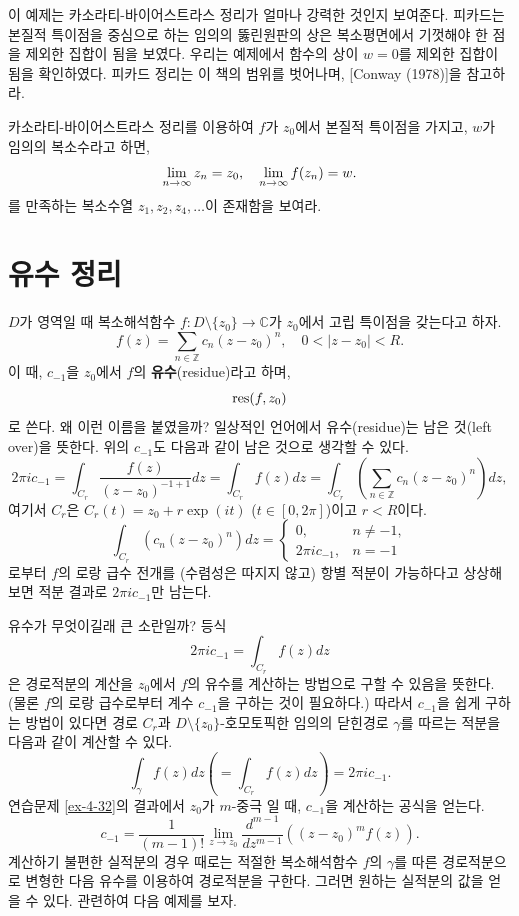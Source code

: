 이 예제는 카소라티-바이어스트라스 정리가 얼마나 강력한 것인지 보여준다.
피카드는 본질적 특이점을 중심으로 하는 임의의 뚫린원판의 상은
복소평면에서 기껏해야 한 점을 제외한 집합이 됨을 보였다.
우리는 예제에서 함수의 상이 $w=0$를 제외한 집합이 됨을 확인하였다.
피카드 정리는 이 책의 범위를 벗어나며, [Conway (1978)]을 참고하라.

\begin{salt_exercise}\label{ex-4-39}
카소라티-바이어스트라스 정리를 이용하여
$f$가 $z_0$에서 본질적 특이점을 가지고,
$w$가 임의의 복소수라고 하면,
\[
\lim\limits_{n\to \infty} z_n = z_0,
\quad
\lim\limits_{n\to\infty} f(z_n) = w.
\]
를 만족하는 복소수열 $z_1, z_2, z_4, \ldots$이 존재함을 보여라.
\end{salt_exercise}

\section{유수 정리}

$D$가 영역일 때
복소해석함수 $f:D\setminus \{z_0\}\to \mathbb C$가
$z_0$에서 고립 특이점을 갖는다고 하자.
\[
f(z) = \sum_{n\in\mathbb Z} c_n (z-z_0)^n,\quad
0<|z-z_0|<R.
\]
이 때, $c_{-1}$을 $z_0$에서 $f$의 {\bf 유수}(residue)라고 하며,
\[
\mathop{\mathrm{res}}(f,z_0)
\]
로 쓴다.
왜 이런 이름을 붙였을까?
일상적인 언어에서 유수(residue)는 남은 것(left over)을 뜻한다.
위의 $c_{-1}$도 다음과 같이 남은 것으로 생각할 수 있다.
\[
2\pi i c_{-1} = \int_{C_r} \dfrac{f(z)}{(z-z_0)^{-1+1}}dz
= \int_{C_r} f(z)dz 
= \int_{C_r} \left( \sum_{n\in\mathbb Z}c_n(z-z_0)^n\right) dz,
\]
여기서 $C_r$은 $C_r(t) = z_0 + r\exp(it)$ ($t\in[0,2\pi]$)이고
$r<R$이다.
\[
\int_{C_r} \left( c_n(z-z_0)^n \right) dz = 
\begin{cases}
0, & n\ne -1, \\
2\pi i c_{-1}, & n= -1
\end{cases}
\]
로부터 $f$의 로랑 급수 전개를 (수렴성은 따지지 않고) 항별 적분이 가능하다고 
상상해보면 적분 결과로 $2\pi i c_{-1}$만 남는다.

유수가 무엇이길래 큰 소란일까? 등식
\[
2\pi i c_{-1}= \int_{C_r} f(z)dz 
\]
은 경로적분의 계산을 $z_0$에서 $f$의 유수를 계산하는 방법으로 구할 수 있음을 뜻한다.
(물론 $f$의 로랑 급수로부터 계수 $c_{-1}$을 구하는 것이 필요하다.)
따라서 $c_{-1}$을 쉽게 구하는 방법이 있다면
경로 $C_r$과 $D\setminus\{z_0\}$-호모토픽한 임의의 닫힌경로 $\gamma$를 따르는 적분을
다음과 같이 계산할 수 있다.
\begin{equation} \label{eq-4-7}
\int_\gamma f(z)dz \left( = \int_{C_r} f(z)dz \right) = 2\pi i c_{-1}.
\end{equation}
연습문제 \ref{ex-4-32}의 결과에서 
$z_0$가 $m$-중극 일 때,
$c_{-1}$을 계산하는 공식을 얻는다.
\[
c_{-1} = \dfrac1{(m-1)!}\lim_{z\to z_0} \dfrac{d^{m-1}}{dz^{m-1}}
\left( (z-z_0)^m f(z) \right).
\]
계산하기 불편한 실적분의 경우 때로는
적절한 복소해석함수 $f$의 $\gamma$를 따른 경로적분으로 변형한 다음
유수를 이용하여 경로적분을 구한다.
그러면 원하는 실적분의 값을 얻을 수 있다.
관련하여 다음 예제를 보자.


